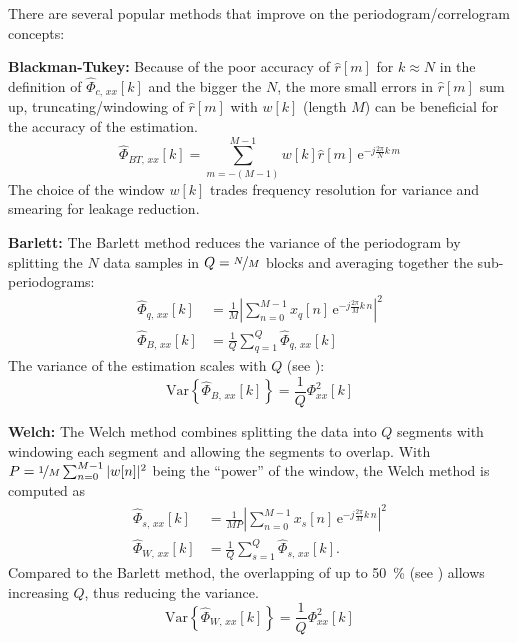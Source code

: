 There are several popular methods that improve on the periodogram/correlogram concepts:

\textbf{Blackman-Tukey:} Because of the poor accuracy of $\hat{r}[m]$ for $k\approx N$ in the definition of $\hat{\Phi}_{c,\,xx}[k]$ and the bigger the $N$, the more small errors in $\hat{r}[m]$ sum up, truncating/windowing of $\hat{r}[m]$ with $w[k]$ (length $M$) can be beneficial for the accuracy of the estimation.
\begin{equation}
\hat{\Phi}_{BT,\,xx}[k] = \sum_{m=-(M-1)}^{M-1} w[k]\hat{r}[m]\,\text{e}^{-j\frac{2\pi}{N}k\,m}
\end{equation}
The choice of the window $w[k]$ trades frequency resolution for variance and smearing for leakage reduction. \cite[p.~41]{Stoica1997}

\textbf{Barlett:} The Barlett method reduces the variance of the periodogram by splitting the $N$ data samples in $Q=\nicefrac{N}{M}$ blocks and averaging together the sub-periodograms:
\begin{align}
\hat{\Phi}_{q,\,xx}[k] &= \frac{1}{M} \left| \sum_{n=0}^{M-1} x_q[n]\,\text{e}^{-j\frac{2\pi}{M}k\,n}\right|^2\\
\hat{\Phi}_{B,\,xx}[k] &= \frac{1}{Q} \sum_{q=1}^{Q} \hat{\Phi}_{q,\,xx}[k]
\end{align}
The variance of the estimation scales with $Q$ (see \cite[p.~6]{Rowell2008}):
\begin{equation}
\text{Var}\left\{\hat{\Phi}_{B,\,xx}[k]\right\} = \frac{1}{Q}\Phi_{xx}^2[k]
\end{equation}

\textbf{Welch:} The Welch method combines splitting the data into $Q$ segments with windowing each segment and allowing the segments to overlap. With $P = \nicefrac{1}{M} \sum_{n=0}^{M-1} |w[n]|^2$ being the ``power'' of the window, the Welch method is computed as
\begin{align}
\hat{\Phi}_{s,\,xx}[k] &= \frac{1}{M P} \left| \sum_{n=0}^{M-1} x_s[n]\,\text{e}^{-j\frac{2\pi}{M}k\,n}\right|^2\\
\hat{\Phi}_{W,\,xx}[k] &= \frac{1}{Q} \sum_{s=1}^{Q} \hat{\Phi}_{s,\,xx}[k].
\end{align}
Compared to the Barlett method, the overlapping of up to \SI{50}{\percent} (see \cite{Welch1967}) allows increasing $Q$, thus reducing the variance.
\begin{equation}\label{eq:varWelch}
\text{Var}\left\{\hat{\Phi}_{W,\,xx}[k]\right\} = \frac{1}{Q}\Phi_{xx}^2[k]
\end{equation}


